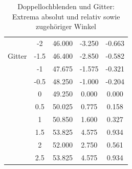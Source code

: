 \documentclass[12pt,a4paper,titlepage,headinclude,bibtotoc]{scrartcl}
\begin{document}
\begin{table}[!htb]
\begin{tabular}{|c||c|c|c|c|}
		&	-2	&	46.000	&	-3.250	&	-0.663	\\
		Gitter &	-1.5	&	46.400	&	-2.850	&	-0.582	\\
		&	-1	&	47.675	&	-1.575	&	-0.321	\\
		&	-0.5	&	48.250	&	-1.000	&	-0.204	\\
		&	0	&	49.250	&	0.000	&	0.000	\\
		&	0.5	&	50.025	&	0.775	&	0.158	\\
		&	1	&	50.850	&	1.600	&	0.327	\\
		&	1.5	&	53.825	&	4.575	&	0.934	\\
		&	2	&	52.000	&	2.750	&	0.561	\\
		&	2.5	&	53.825	&	4.575	&	0.934	\\
		\hline
	\end{tabular}
	\caption{Doppellochblenden und Gitter: Extrema absolut und relativ sowie zugehöriger Winkel}	
	\label{tab:extrema2}
\end{table}



\end{document}
